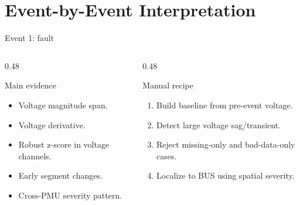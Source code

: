 ﻿\documentclass[10pt,aspectratio=169]{beamer}
\begin{document}

\fi
\section{Event-by-Event Interpretation}


\begin{frame}{Event 1: fault}
\small
\begin{columns}[T,totalwidth=\textwidth]
\begin{column}{0.48\textwidth}
\begin{block}{Main evidence}
\begin{itemize}
  \item Voltage magnitude span.
  \item Voltage derivative.
  \item Robust z-score in voltage channels.
  \item Early segment changes.
  \item Cross-PMU severity pattern.
\end{itemize}
\end{block}
\end{column}
\begin{column}{0.48\textwidth}
\begin{alertblock}{Manual recipe}
\begin{enumerate}
  \item Build baseline from pre-event voltage.
  \item Detect large voltage sag/transient.
  \item Reject missing-only and bad-data-only cases.
  \item Localize to BUS using spatial severity.
\end{enumerate}
\end{alertblock}
\end{column}
\end{columns}
\end{frame}
\end{document}
